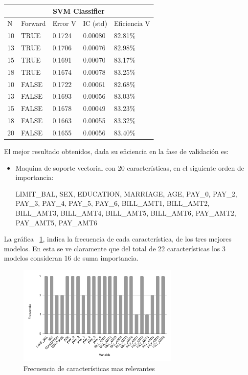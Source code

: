 \documentclass[conference]{IEEEtran}
\begin{document}
\begin{table}[H]
\centering
\begin{tabular}{lllll}
\hline
\multicolumn{5}{c}{\textbf{SVM Classifier}} \\ \hline
N & Forward & Error V & IC (std) & Eficiencia V \\ \hline
10 & TRUE & 0.1724 & 0.00080 & 82.81\% \\
13 & TRUE & 0.1706 & 0.00076 & 82.98\% \\
15 & TRUE & 0.1691 & 0.00070 & 83.17\% \\
18 & TRUE & 0.1674 & 0.00078 & 83.25\% \\
10 & FALSE & 0.1722 & 0.00061 & 82.68\% \\
13 & FALSE & 0.1693 & 0.00056 & 83.03\% \\
15 & FALSE & 0.1678 & 0.00049 & 83.23\% \\
18 & FALSE & 0.1663 & 0.00055 & 83.32\% \\
20 & FALSE & 0.1655 & 0.00056 & 83.40\% \\ \hline
\end{tabular}
\end{table}\hfill

El mejor resultado obtenidos, dada su eficiencia en la fase de validación es:
\begin{itemize}
\item Maquina de soporte vectorial con 20 características, en el siguiente orden de importancia:

LIMIT\_BAL, SEX, EDUCATION, MARRIAGE, AGE, PAY\_0, PAY\_2, PAY\_3, PAY\_4, PAY\_5, PAY\_6, BILL\_AMT1, BILL\_AMT2, BILL\_AMT3, BILL\_AMT4, BILL\_AMT5, BILL\_AMT6, PAY\_AMT2, PAY\_AMT5, PAY\_AMT6

\end{itemize}
La gráfica ~\ref{fig:frecFeatures}, indica la frecuencia de cada característica, de los tres mejores modelos. En esta se ve claramente que del total de 22 características los 3 modelos consideran 16 de suma importancia.

\begin{center}
    \begin{figure}[H]
        \hfill
     \centerline{\includegraphics[width=8cm]{frecuencia.png}}
    \caption{Frecuencia de características mas relevantes}
    \label{fig:frecFeatures}
    \end{figure}  
\end{center}
\end{document}

